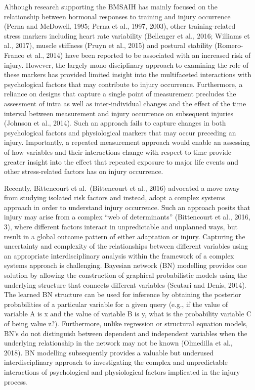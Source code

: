 \documentclass[
  english,
  man]{apa6}
\begin{document}
Although research supporting the BMSAIH has mainly focused on the relationship between hormonal responses to training and injury occurrence (Perna and McDowell, 1995; Perna et al., 1997, 2003), other training-related stress markers including heart rate variability (Bellenger et al., 2016; Williams et al., 2017), muscle stiffness (Pruyn et al., 2015) and postural stability (Romero-Franco et al., 2014) have been reported to be associated with an increased risk of injury. However, the largely mono-disciplinary approach to examining the role of these markers has provided limited insight into the multifaceted interactions with psychological factors that may contribute to injury occurrence. Furthermore, a reliance on designs that capture a single point of measurement precludes the assessment of intra as well as inter-individual changes and the effect of the time interval between measurement and injury occurrence on subsequent injuries (Johnson et al., 2014). Such an approach fails to capture changes in both psychological factors and physiological markers that may occur preceding an injury. Importantly, a repeated measurement approach would enable an assessing of how variables and their interactions change with respect to time provide greater insight into the effect that repeated exposure to major life events and other stress-related factors has on injury occurrence.

Recently, Bittencourt et al.~(Bittencourt et al., 2016) advocated a move away from studying isolated risk factors and instead, adopt a complex systems approach in order to understand injury occurrence. Such an approach posits that injury may arise from a complex ``web of determinants'' (Bittencourt et al., 2016, 3), where different factors interact in unpredictable and unplanned ways, but result in a global outcome pattern of either adaptation or injury. Capturing the uncertainty and complexity of the relationships between different variables using an appropriate interdisciplinary analysis within the framework of a complex systems approach is challenging. Bayesian network (BN) modelling provides one solution by allowing the construction of graphical probabilistic models using the underlying structure that connects different variables (Scutari and Denis, 2014). The learned BN structure can be used for inference by obtaining the posterior probabilities of a particular variable for a given query (e.g., if the value of variable A is x and the value of variable B is y, what is the probability variable C of being value z?). Furthermore, unlike regression or structural equation models, BN's do not distinguish between dependent and independent variables when the underlying relationship in the network may not be known (Olmedilla et al., 2018). BN modelling subsequently provides a valuable but underused interdisciplinary approach to investigating the complex and unpredictable interactions of psychological and physiological factors implicated in the injury process.
\end{document}
